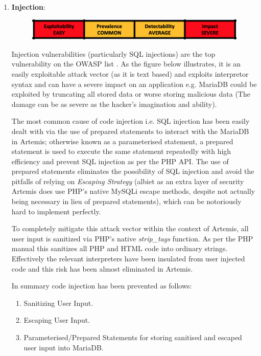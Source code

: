 \begin{enumerate}
    \item \textbf{Injection}:
    
    \begin{figure}[H]
    	\centering
    	\includegraphics[scale=0.80]{figures/injection}
    	\label{injection}
    \end{figure}
    
    
    Injection vulnerabilities (particularly SQL injections) are the top vulnerability on the OWASP list \cite{OWASP2017}. As the figure below illustrates, it is an easily exploitable attack vector (as it is text based) and exploits interpretor syntax and can have a severe impact on an application e.g. MariaDB could be exploited by truncating all stored data or worse storing malicious data (The damage can be as severe as the hacker's imagination and ability).
    

    The most common cause of code injection i.e. SQL injection has been easily dealt with via the use of prepared statements to interact with the MariaDB in Artemis; otherwise known as a parameterised statement, a prepared statement is used to execute the same statement repeatedly with high efficiency and prevent SQL injection as per the PHP API\cite{PHP}. The use of prepared statements eliminates the possibility of SQL injection and avoid the pitfalls of relying on \textit{Escaping Strategy} (albiet as an extra layer of security Artemis does use PHP's native MySQLi escape methods, despite not actually being necessary in lieu of prepared statements), which can be notoriously hard to implement perfectly.
    
    To completely mitigate this attack vector within the context of Artemis, all user input is  sanitized via PHP's native \textit{strip\_tags} function. As per the PHP manual this sanitizes all PHP and HTML code into ordinary strings. Effectively the relevant interpreters have been insulated from user injected code and this risk has been almost eliminated in Artemis.
    
    In summary code injection has been prevented as follows:
    \begin{enumerate}
        \item Sanitizing User Input.
        \item Escaping User Input.
        \item Parameterised/Prepared Statements for storing sanitised and escaped user input into MariaDB.
    \end{enumerate}
    

\end{enumerate}
